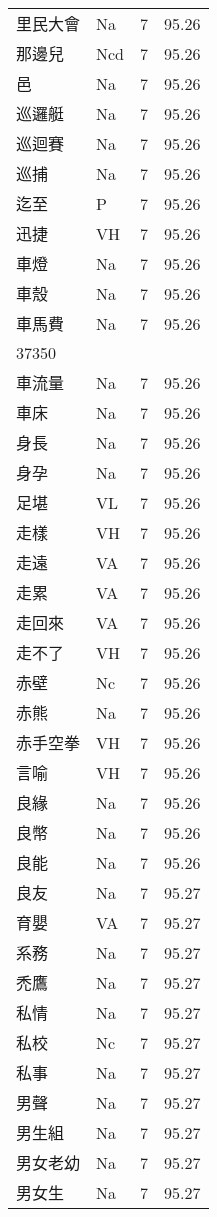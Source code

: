 \documentclass[twocolumn]{book}
\begin{document}
\begin{supertabular}{llrr}
里民大會 & Na & 7 &  95.26\\
那邊兒 & Ncd & 7 &  95.26\\
邑 & Na & 7 &  95.26\\
巡邏艇 & Na & 7 &  95.26\\
巡迴賽 & Na & 7 &  95.26\\
巡捕 & Na & 7 &  95.26\\
迄至 & P & 7 &  95.26\\
迅捷 & VH & 7 &  95.26\\
車燈 & Na & 7 &  95.26\\
車殼 & Na & 7 &  95.26\\
車馬費 & Na & 7 &  95.26\\
37350\\
車流量 & Na & 7 &  95.26\\
車床 & Na & 7 &  95.26\\
身長 & Na & 7 &  95.26\\
身孕 & Na & 7 &  95.26\\
足堪 & VL & 7 &  95.26\\
走樣 & VH & 7 &  95.26\\
走遠 & VA & 7 &  95.26\\
走累 & VA & 7 &  95.26\\
走回來 & VA & 7 &  95.26\\
走不了 & VH & 7 &  95.26\\
赤壁 & Nc & 7 &  95.26\\
赤熊 & Na & 7 &  95.26\\
赤手空拳 & VH & 7 &  95.26\\
言喻 & VH & 7 &  95.26\\
良緣 & Na & 7 &  95.26\\
良幣 & Na & 7 &  95.26\\
良能 & Na & 7 &  95.26\\
良友 & Na & 7 &  95.27\\
育嬰 & VA & 7 &  95.27\\
系務 & Na & 7 &  95.27\\
禿鷹 & Na & 7 &  95.27\\
私情 & Na & 7 &  95.27\\
私校 & Nc & 7 &  95.27\\
私事 & Na & 7 &  95.27\\
男聲 & Na & 7 &  95.27\\
男生組 & Na & 7 &  95.27\\
男女老幼 & Na & 7 &  95.27\\
男女生 & Na & 7 &  95.27\\

\end{supertabular}
\end{document}

